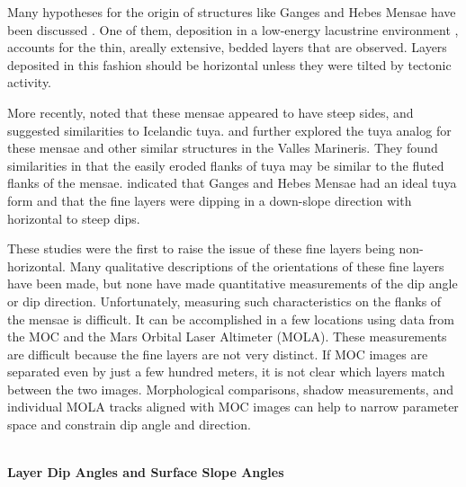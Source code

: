 \documentclass{lpscabs}
\begin{document}
\begin{abstracttext}
Many hypotheses for the origin of structures like Ganges and Hebes
Mensae have been discussed \citep[see][for a review]{1992mars.book..453L}.
One of them, deposition in a low-energy lacustrine environment
\citep{1987Icar...70..409N,2000Sci...290.1927M}, accounts for the
thin, areally extensive, bedded layers that are observed.  Layers
deposited in this fashion should be horizontal unless they were
tilted by tectonic activity.

More recently, \citet{1994JGR....99.3783L} noted that these mensae
appeared to have steep sides, and suggested similarities to Icelandic
tuya.  \citet{2001JGR...10610087C} and \citet{2004PSS...52..167K}
further explored the tuya analog for these mensae and other similar
structures in the Valles Marineris.  They found similarities in
that the easily eroded flanks of tuya may be similar to the fluted
flanks of the mensae.  \citet{2001JGR...10610087C} indicated that
Ganges and Hebes Mensae had an ideal tuya form and that the fine
layers were dipping in a down-slope direction with horizontal to
steep dips.

These studies were the first to raise the issue of these fine layers
being non-horizontal.  Many qualitative descriptions of the
orientations of these fine layers have been made, but none have
made quantitative measurements of the dip angle or dip direction.
Unfortunately, measuring such characteristics
on the flanks of the mensae is difficult.  It can be accomplished
in a few locations using data from the MOC
and the Mars Orbital Laser Altimeter (MOLA).  These measurements
are difficult because the fine layers are not very distinct.  If
MOC images are separated even by just a few hundred meters, it is
not clear which layers match between the two images.  Morphological
comparisons, shadow measurements, and individual MOLA tracks aligned
with MOC images can help to narrow parameter space and constrain
dip angle and direction.


~\\
\textbf{Layer Dip Angles and Surface Slope Angles}\\


\end{abstracttext}
\end{document}
